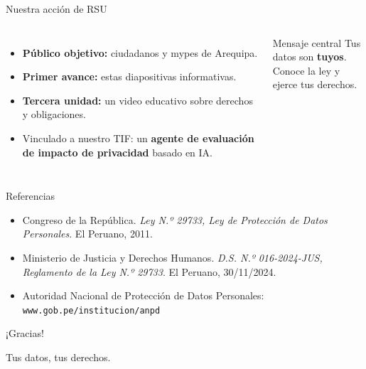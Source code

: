 \documentclass[aspectratio=169,11pt]{beamer}
\begin{document}
\begin{frame}{Nuestra acción de RSU}
\begin{columns}[c]
\begin{itemize}\small
  \item \textbf{Público objetivo:} ciudadanos y mypes de Arequipa.
  \item \textbf{Primer avance:} estas diapositivas informativas.
  \item \textbf{Tercera unidad:} un video educativo sobre derechos y obligaciones.
  \item Vinculado a nuestro TIF: un \textbf{agente de evaluación de impacto de privacidad} basado en IA.
\end{itemize}
\begin{block}{Mensaje central}
\centering\large Tus datos son \textbf{tuyos}.\\ Conoce la ley y ejerce tus derechos.
\end{block}
\end{columns}
\end{frame}

\begin{frame}{Referencias}
\small
\begin{itemize}
  \item Congreso de la República. \emph{Ley N.º 29733, Ley de Protección de Datos Personales}. El Peruano, 2011.
  \item Ministerio de Justicia y Derechos Humanos. \emph{D.S. N.º 016-2024-JUS, Reglamento de la Ley N.º 29733}. El Peruano, 30/11/2024.
  \item Autoridad Nacional de Protección de Datos Personales: \texttt{www.gob.pe/institucion/anpd}
\end{itemize}
\end{frame}

\begin{frame}[standout]
¡Gracias!

\vspace{3mm}\small Tus datos, tus derechos.
\end{frame}
\end{document}
